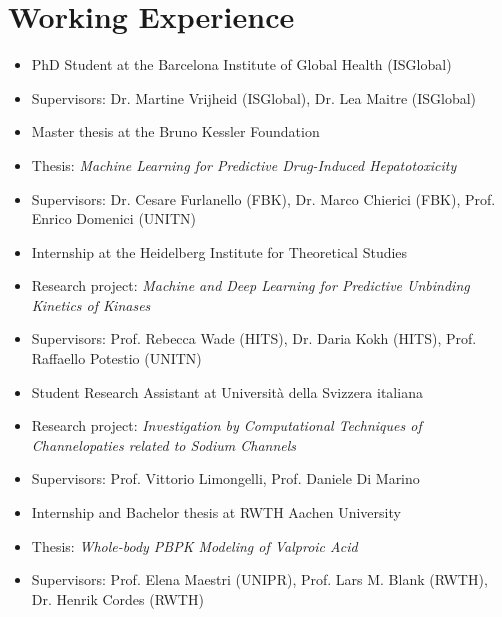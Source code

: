 \section{Working Experience}

\begin{itemize}
  \item PhD Student at the Barcelona Institute of Global Health (ISGlobal)
  \item Supervisors: Dr. Martine Vrijheid (ISGlobal), Dr. Lea Maitre (ISGlobal)
\end{itemize}


\begin{itemize}
  \item Master thesis at the Bruno Kessler Foundation
  \item Thesis: \textit{Machine Learning for Predictive Drug-Induced Hepatotoxicity}
  \item Supervisors: Dr. Cesare Furlanello (FBK), Dr. Marco Chierici (FBK), Prof. Enrico Domenici (UNITN)
\end{itemize}


\begin{itemize}
  \item Internship at the Heidelberg Institute for Theoretical Studies
  \item Research project: \textit{Machine and Deep Learning for Predictive Unbinding Kinetics of Kinases}
  \item Supervisors: Prof. Rebecca Wade (HITS), Dr. Daria Kokh (HITS), Prof. Raffaello Potestio (UNITN)
\end{itemize}


\begin{itemize}
  \item Student Research Assistant at Università della Svizzera italiana
  \item Research project: \textit{Investigation by Computational Techniques of Channelopaties related to Sodium Channels}
  \item Supervisors: Prof. Vittorio Limongelli, Prof. Daniele Di Marino
\end{itemize}


\begin{itemize}
  \item Internship and Bachelor thesis at RWTH Aachen University
  \item Thesis: \textit{Whole-body PBPK Modeling of Valproic Acid}
  \item Supervisors: Prof. Elena Maestri (UNIPR), Prof. Lars M. Blank (RWTH), Dr. Henrik Cordes (RWTH)
\end{itemize}
